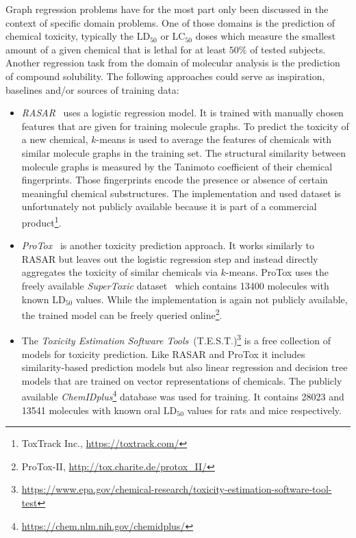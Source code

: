 \documentclass[12pt]{scrartcl}
\begin{document}
Graph regression problems have for the most part only been discussed in the context of specific domain problems.
One of those domains is the prediction of chemical toxicity, typically the $\text{LD}_{50}$ or $\text{LC}_{50}$ doses which measure the smallest amount of a given chemical that is lethal for at least $50\%$ of tested subjects.
Another regression task from the domain of molecular analysis is the prediction of compound solubility.
The following approaches could serve as inspiration, baselines and/or sources of training data:
\begin{itemize}
	\item \textit{RASAR}~\cite{Luechtefeld2018} uses a logistic regression model.
		It is trained with manually chosen features that are given for training molecule graphs.
		To predict the toxicity of a new chemical, $k$-means is used to average the features of chemicals with similar molecule graphs in the training set.
		The structural similarity between molecule graphs is measured by the Tanimoto coefficient of their chemical fingerprints.
		Those fingerprints encode the presence or absence of certain meaningful chemical substructures.
		The implementation and used dataset is unfortunately not publicly available because it is part of a commercial product\footnote{ToxTrack Inc., \url{https://toxtrack.com/}}.
	\item \textit{ProTox}~\cite{Drwal2014}\cite{Banerjee2018} is another toxicity prediction approach.
		It works similarly to RASAR but leaves out the logistic regression step and instead directly aggregates the toxicity of similar chemicals via $k$-means.
		ProTox uses the freely available \textit{SuperToxic} dataset~\cite{Schmidt2009} which contains 13400 molecules with known $\text{LD}_{50}$ values.
		While the implementation is again not publicly available, the trained model can be freely queried online\footnote{ProTox-II, \url{http://tox.charite.de/protox_II/}}.
	\item The \textit{Toxicity Estimation Software Tools}~(T.E.S.T.)\footnote{\url{https://www.epa.gov/chemical-research/toxicity-estimation-software-tool-test}} is a free collection of models for toxicity prediction.
		Like RASAR and ProTox it includes similarity-based prediction models but also linear regression and decision tree models that are trained on vector representations of chemicals.
		The publicly available \textit{ChemIDplus}\footnote{\url{https://chem.nlm.nih.gov/chemidplus/}} database was used for training.
		It contains 28023 and 13541 molecules with known oral $\text{LD}_{50}$ values for rats and mice respectively.

\end{itemize}
\end{document}
